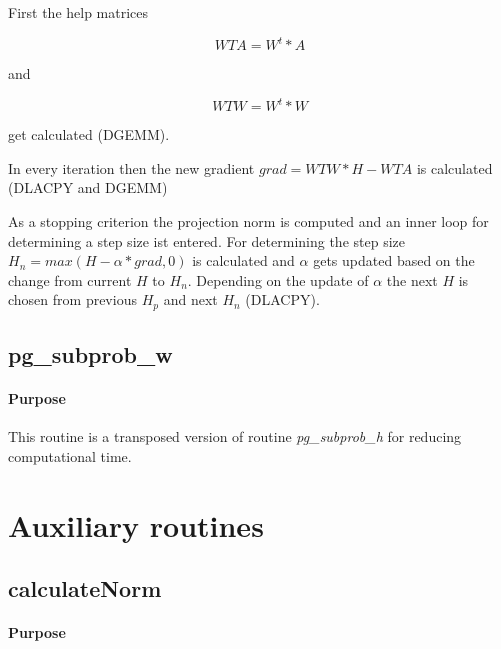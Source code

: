 \documentclass[a4paper,10pt]{scrartcl}
\begin{document}
					First the help matrices

					\begin{equation*}
						WTA = W^t * A
					\end{equation*}

					and
	
					\begin{equation*}
 						WTW = W^t * W
					\end{equation*}

					get calculated (DGEMM).\newline


					In every iteration then the new gradient $grad = WTW*H - WTA$ is
					calculated (DLACPY and DGEMM)\newline

					As a stopping criterion the projection norm is computed and an inner loop
					for determining a step size ist entered.\newline
					For determining the step size $H_n = max(H - \alpha * grad, 0)$ is
					calculated and $\alpha$ gets updated based on the change from current $H$ 
					to $H_n$. Depending on the update of $\alpha$ the next $H$ is chosen from
					previous $H_p$ and next $H_n$ (DLACPY).\newline

		\subsection{pg\_subprob\_w}

			\paragraph{Purpose}
				
					This routine is a transposed version of routine \emph{pg\_subprob\_h} for reducing
					computational time.\newline



	\section{Auxiliary routines}


		\subsection{calculateNorm}

			\paragraph{Purpose}
\end{document}
